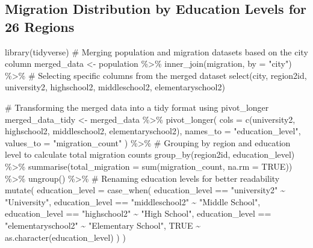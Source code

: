 \documentclass[
  11pt,
  a4paper,
  DIV=11,
  numbers=noendperiod]{scrartcl}
\newenvironment{Shaded}{\begin{snugshade}}{\end{snugshade}}
\newcommand{\AttributeTok}[1]{\textcolor[rgb]{0.40,0.45,0.13}{#1}}
\newcommand{\CommentTok}[1]{\textcolor[rgb]{0.37,0.37,0.37}{#1}}
\newcommand{\ConstantTok}[1]{\textcolor[rgb]{0.56,0.35,0.01}{#1}}
\newcommand{\FunctionTok}[1]{\textcolor[rgb]{0.28,0.35,0.67}{#1}}
\newcommand{\NormalTok}[1]{\textcolor[rgb]{0.00,0.23,0.31}{#1}}
\newcommand{\OtherTok}[1]{\textcolor[rgb]{0.00,0.23,0.31}{#1}}
\newcommand{\SpecialCharTok}[1]{\textcolor[rgb]{0.37,0.37,0.37}{#1}}
\newcommand{\StringTok}[1]{\textcolor[rgb]{0.13,0.47,0.30}{#1}}
\begin{document}
\hypertarget{migration-distribution-by-education-levels-for-26-regions}{%
\subsection{Migration Distribution by Education Levels for 26
Regions}\label{migration-distribution-by-education-levels-for-26-regions}}

\begin{Shaded}
\begin{Highlighting}[]
\FunctionTok{library}\NormalTok{(tidyverse)}
\CommentTok{\# Merging population and migration datasets based on the \textquotesingle{}city\textquotesingle{} column}
\NormalTok{merged\_data }\OtherTok{\textless{}{-}}\NormalTok{ population }\SpecialCharTok{\%\textgreater{}\%}
  \FunctionTok{inner\_join}\NormalTok{(migration, }\AttributeTok{by =} \StringTok{"city"}\NormalTok{) }\SpecialCharTok{\%\textgreater{}\%}
  \CommentTok{\# Selecting specific columns from the merged dataset}
  \FunctionTok{select}\NormalTok{(city, region2id, university2, highschool2, middleschool2, elementaryschool2)}

\CommentTok{\# Transforming the merged data into a tidy format using pivot\_longer}
\NormalTok{merged\_data\_tidy }\OtherTok{\textless{}{-}}\NormalTok{ merged\_data }\SpecialCharTok{\%\textgreater{}\%}
  \FunctionTok{pivot\_longer}\NormalTok{(}
    \AttributeTok{cols =} \FunctionTok{c}\NormalTok{(university2, highschool2, middleschool2, elementaryschool2),}
    \AttributeTok{names\_to =} \StringTok{"education\_level"}\NormalTok{,}
    \AttributeTok{values\_to =} \StringTok{"migration\_count"}
\NormalTok{  ) }\SpecialCharTok{\%\textgreater{}\%}
  \CommentTok{\# Grouping by region and education level to calculate total migration counts}
  \FunctionTok{group\_by}\NormalTok{(region2id, education\_level) }\SpecialCharTok{\%\textgreater{}\%}
  \FunctionTok{summarise}\NormalTok{(}\AttributeTok{total\_migration =} \FunctionTok{sum}\NormalTok{(migration\_count, }\AttributeTok{na.rm =} \ConstantTok{TRUE}\NormalTok{)) }\SpecialCharTok{\%\textgreater{}\%}
  \FunctionTok{ungroup}\NormalTok{() }\SpecialCharTok{\%\textgreater{}\%}
  \CommentTok{\# Renaming education levels for better readability}
  \FunctionTok{mutate}\NormalTok{(}
    \AttributeTok{education\_level =} \FunctionTok{case\_when}\NormalTok{(}
\NormalTok{      education\_level }\SpecialCharTok{==} \StringTok{"university2"} \SpecialCharTok{\textasciitilde{}} \StringTok{"University"}\NormalTok{,}
\NormalTok{      education\_level }\SpecialCharTok{==} \StringTok{"middleschool2"} \SpecialCharTok{\textasciitilde{}} \StringTok{"Middle School"}\NormalTok{,}
\NormalTok{      education\_level }\SpecialCharTok{==} \StringTok{"highschool2"} \SpecialCharTok{\textasciitilde{}} \StringTok{"High School"}\NormalTok{,}
\NormalTok{      education\_level }\SpecialCharTok{==} \StringTok{"elementaryschool2"} \SpecialCharTok{\textasciitilde{}} \StringTok{"Elementary School"}\NormalTok{,}
      \ConstantTok{TRUE} \SpecialCharTok{\textasciitilde{}} \FunctionTok{as.character}\NormalTok{(education\_level)}
\NormalTok{    )}
\NormalTok{  )  }


\end{Highlighting}
\end{Shaded}
\end{document}
